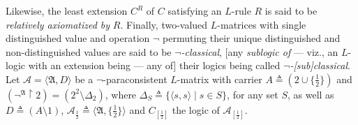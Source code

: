 \documentclass[bsl,meeting]{asl}
\newcommand{\mf}[1]{\mathfrak{#1}}
\newcommand{\mc}[1]{\mathcal{#1}}
\newcommand{\mbf}[1]{\mathbf{#1}}
\newcommand{\couple}[2]{\langle{#1},{#2}\rangle}
\newcommand{\restr}{{\upharpoonright}}
\def\e{{\frac{1}{2}} }
\begin{document}
Likewise, the least extension $C^R$ of $C$
satisfying an $L$-rule $R$
is said to be {\em
relatively axiomatized by\/} $R$.
Finally, two-valued $L$-matrices
with single
distinguished value %
and operation $\neg$ %
permuting their unique distinguished and non-distinguished values
are said to be {\em %
$\neg$-classical},
[any {\em sublogic of\/} --- viz., an $L$-logic with an extension being --- any of] their logics
being called {\em $\neg$-[sub]classical}.
Let $\mc{A}=\couple{\mathfrak{A}}{D}$ be
a $\neg$-paraconsistent $L$-matrix
with carrier $A\triangleq(2\cup\{\e\})$ and
$(\neg^{\mf{A}}\restr2)=(2^2\setminus\Delta_2)$,
where $\Delta_S\triangleq\{\couple{s}{s}\mid s\in S\}$,
for any set $S$,
as well as %
$D\triangleq(A\setminus1)$,
$\mc{A}_\e\triangleq\couple{\mf{A}}{\{\e\}}$
and $C_{[\e]}$ the logic of $\mc{A}_{[\e]}$. %

\end{document}
